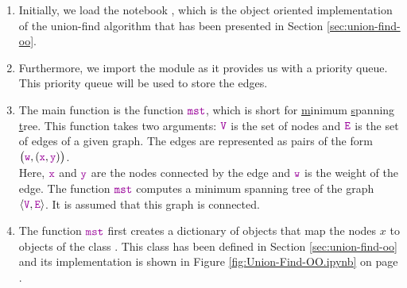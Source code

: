 \begin{enumerate}
\item Initially, we load the notebook , which is the object oriented 
      implementation of the union-find algorithm that has been presented in Section \ref{sec:union-find-oo}.
\item Furthermore, we import the module  as it provides us with a priority queue.  This priority
      queue will be used to store the edges.
\item The main function is the function $\mytt{mst}$, which is short for \underline{m}inimum
      \underline{s}panning \underline{t}ree.  This function takes two arguments:
      $\mytt{V}$ is the set of nodes and $\mytt{E}$ is the set of edges of a given graph.  The edges are represented as
      pairs of the form
      \\[0.2cm]
      \hspace*{1.3cm}
      $\bigl(\mytt{w}, (\mytt{x}, \mytt{y})\bigr)$.
      \\[0.2cm] 
      Here, $\mytt{x}$ and $\mytt{y}$ are the nodes connected by the edge and $\mytt{w}$ is the
      weight of the edge.  The function $\mytt{mst}$ computes a minimum spanning tree of  the
      graph  $\pair(\mytt{V},\mytt{E})$.  It is assumed that this graph is connected.
\item The function $\mytt{mst}$ first creates a dictionary of  objects that map the nodes $x$ to
      objects of the class .  This class has been defined in Section \ref{sec:union-find-oo} and its
      implementation is shown in Figure \ref{fig:Union-Find-OO.ipynb} on page \pageref{fig:Union-Find-OO.ipynb}.


\end{enumerate}
